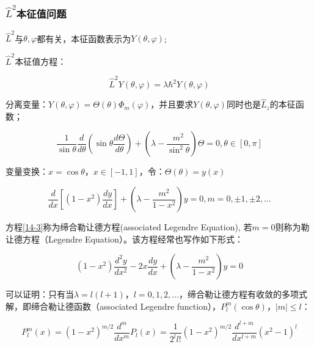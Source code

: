 \subsubsection{$\hat L ^2$本征值问题}

$\hat L ^2$与$\theta, \varphi$都有关，本征函数表示为$Y(\theta ,\varphi )$;

$\hat L ^2$本征值方程：

\begin{equation}
\widehat L^2 Y(\theta ,\varphi ) = \lambda \hbar ^2 Y(\theta ,\varphi )
\end{equation}

分离变量：$Y(\theta ,\varphi ) = \Theta (\theta )\Phi _m (\varphi )$，并且要求$Y(\theta ,\varphi )$同时也是$\widehat L_z $的本征函数；

\begin{equation}\label{14-2}
\frac{1}{{\sin \theta }}\frac{d}{{d\theta }}\left( {\sin \theta \frac{{d\Theta }}{{d\theta }}} \right) + \left( {\lambda  - \frac{{m^2 }}{{\sin ^2 \theta }}} \right)\Theta  = 0, \theta  \in \left[ {0,\pi } \right]
\end{equation}

变量变换：$x = \cos \theta $，$x \in \left[ { - 1,1} \right]$，令：$\Theta \left( \theta  \right) = y(x)$

\begin{equation}\label{14-3}
\frac{d}{{dx}}\left[ {\left( {1 - x^2 } \right)\frac{{dy}}{{dx}}} \right] + \left( {\lambda  - \frac{{m^2 }}{{1 - x^2 }}} \right)y = 0, m = 0, \pm 1, \pm 2,...
\end{equation}

方程\ref{14-3}称为缔合勒让德方程(associated Legendre Equation), 若$m=0$则称为勒让德方程（Legendre Equation）。该方程经常也写作如下形式：

\begin{equation}\label{14-4}
\left( {1 - x^2 } \right)\frac{{d^2 y}}{{dx^2 }} - 2x\frac{{dy}}{{dx}} + \left( {\lambda  - \frac{{m^2 }}{{1 - x^2 }}} \right)y = 0
\end{equation}

可以证明：只有当$\lambda  = l(l + 1)$，$l = 0,1,2,...$，缔合勒让德方程有收敛的多项式解，即缔合勒让德函数（associated Legendre function），$P_l^m (\cos \theta )$，$\left| m \right| \le l$：

\begin{equation}\label{14-5}
P_l^m (x) = \left( {1 - x^2 } \right)^{m/2} \frac{{d^m }}{{dx^m }}P_l (x) = \frac{1}{{2^l l!}}\left( {1 - x^2 } \right)^{m/2} \frac{{d^{l + m} }}{{dx^{l + m} }}\left( {x^2  - 1} \right)^l
\end{equation}

